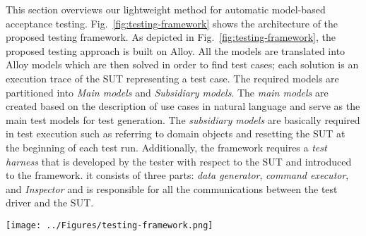%
%
\label{sec:framework-overview}
This section overviews our lightweight method for automatic model-based acceptance testing. 
Fig.~\ref{fig:testing-framework} shows the architecture of the proposed testing framework. As depicted in Fig.~\ref{fig:testing-framework}, the proposed testing approach is built on Alloy. All the models are translated into Alloy models which are then solved in order to find test cases; each solution is an execution trace of the SUT representing a test case. The required models are partitioned into \textit{Main models} and \textit{Subsidiary models}. The \textit{main models} are created based on the description of use cases in natural language and serve as the main test models for test generation. The \textit{subsidiary models} are basically required in test execution such as referring to domain objects and resetting the SUT at the beginning of each test run. Additionally, the framework requires a \textit{test harness} that is developed by the tester with respect to the SUT and introduced to the framework. it consists of three parts: \textit{data generator}, \textit{command executor}, and \textit{Inspector} and is responsible for all the communications between the test driver and the SUT.

\begin{figure*}[ht]
\centering
\texttt{[image: ../Figures/testing-framework.png]}
\caption{The architecture of the proposed testing framework.}
\label{fig:testing-framework}
\end{figure*}

